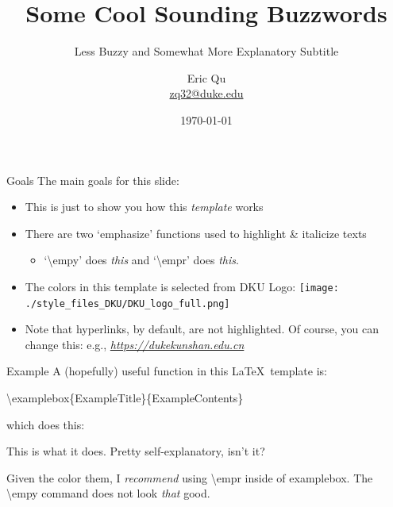 \documentclass[pdf]{beamer}
\title[Buzz Words, maybe Clever Abbreviations]{Some Cool Sounding Buzzwords}
\subtitle{Less Buzzy and Somewhat More Explanatory Subtitle}
\newcommand{\empy}[1]{{\color{DKULightBlue}\emph{#1}}}
\newcommand{\empr}[1]{{\color{DKUDarkBlue}\emph{#1}}}
\theoremstyle{remark}
\theoremstyle{definition}
\newcommand{\examplebox}[2]{
\begin{tcolorbox}[colframe=DKUDarkGreen,colback=boxgray,title=#1]
#2
\end{tcolorbox}}
\begin{document}
\author[Eric Qu, DKU]{
	\begin{tabular}{c} 
	\Large
	Eric Qu\\
    \footnotesize \href{mailto:zq32@duke.edu}{zq32@duke.edu}
\end{tabular}
\vspace{-4ex}}


\date{\today}

\begin{noheadline}
\begin{frame}\maketitle\end{frame}
\end{noheadline}



\begin{frame}{Goals}
The main goals for this slide:
\begin{itemize}
	\item This is just to show you how this \empy{template} works
	\item There are two `emphasize' functions used to highlight \& italicize texts
	\begin{itemize}
		\item `\textbackslash empy' does \empy{this} and `\textbackslash empr' does \empr{this}.
	\end{itemize}
	\item The colors in this template is selected from DKU Logo: 
	\texttt{[image: ./style\_files\_DKU/DKU\_logo\_full.png]}
	\item Note that hyperlinks, by default, are not highlighted. Of course, you can change this: e.g., \empr{\href{https://dukekunshan.edu.cn}{https://dukekunshan.edu.cn}}
\end{itemize}
\end{frame}



\begin{frame}{Example}
A (hopefully) useful function in this \LaTeX~template is:
\begin{center}
	\textbackslash examplebox\{ExampleTitle\}\{ExampleContents\}
\end{center}
which does this:
\examplebox{Example of the Command \textbackslash examplebox}{
This is what it does. Pretty self-explanatory, isn't it?

Given the color them, I \empr{recommend} using \textbackslash empr inside of examplebox. The \textbackslash empy command does not look \empy{that} good.
}
\end{frame}
\end{document}
